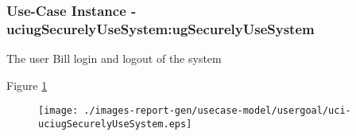 
	\subsubsection{Use-Case Instance - uciugSecurelyUseSystem:ugSecurelyUseSystem}
	
	The user Bill login and logout of the system		  
	\begin{operationmodel}
	
	\end{operationmodel} 

	
	Figure \ref{fig:lu.uni.lassy.excalibur.examples.icrash-RE-UC-uci-uciugSecurelyUseSystem}
	
	\begin{figure}[htbp]
	\begin{center}
	
	\texttt{[image: ./images-report-gen/usecase-model/usergoal/uci-uciugSecurelyUseSystem.eps]}
	\end{center}
	\caption[lu.uni.lassy.excalibur.examples.icrash Sequence Diagram: uci-uciugSecurelyUseSystem]{}
	\label{fig:lu.uni.lassy.excalibur.examples.icrash-RE-UC-uci-uciugSecurelyUseSystem}
	\end{figure}
	\vspace{0.5cm}
